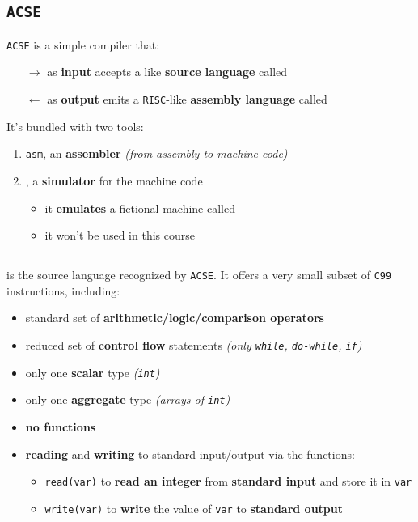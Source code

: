 \subsection{\texttt{ACSE}}

\texttt{ACSE} is a simple compiler that:

\begin{itemize}
  \item[\(\rightarrow\)] as \textbf{input} accepts a \clang like \textbf{source language} called \lance
  \item[\(\leftarrow\)] as \textbf{output} emits a \texttt{RISC}-like \textbf{assembly language} called \mace
\end{itemize}

It's bundled with two tools:

\begin{enumerate}
  \item \texttt{asm}, an \textbf{assembler} \textit{(from assembly to machine code)}
  \item \mace, a \textbf{simulator} for the machine code
        \begin{itemize}
          \item it \textbf{emulates} a fictional machine called \mace
          \item it won't be used in this course
        \end{itemize}
\end{enumerate}

\subsection{\lance}

\lance is the source language recognized by \texttt{ACSE}.
It offers a very small subset of \texttt{C99} instructions, including:

\begin{itemize}[label=\textbf{\texttt{>}}]
  \item standard set of \textbf{arithmetic/logic/comparison operators}
  \item reduced set of \textbf{control flow} statements \textit{(only \texttt{while}, \texttt{do-while}, \texttt{if})}
  \item only one \textbf{scalar} type \textit{(\texttt{int})}
  \item only one \textbf{aggregate} type \textit{(arrays of \texttt{int})}
  \item \textbf{no functions}
  \item \textbf{reading} and \textbf{writing} to standard input/output via the functions:
        \begin{itemize}
          \item \texttt{read(var)} to \textbf{read an integer} from \textbf{standard input} and store it in \texttt{var}
          \item \texttt{write(var)} to \textbf{write} the value of \texttt{var} to \textbf{standard output}
        \end{itemize}
\end{itemize}

